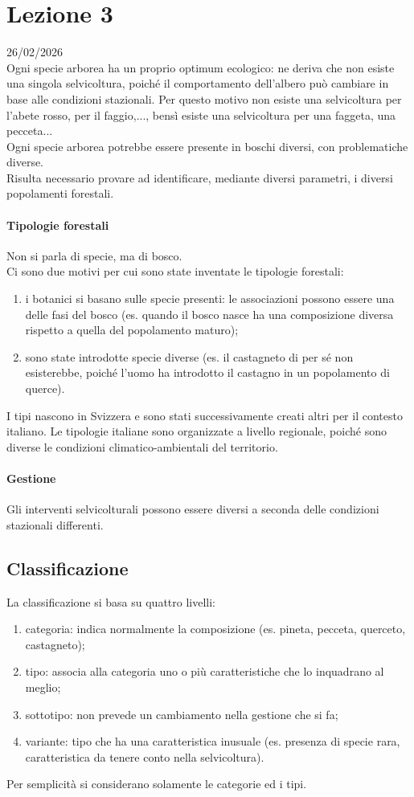 \section{Lezione 3} \hfill 26/02/2026\\
Ogni specie arborea ha un proprio optimum ecologico: ne deriva che non esiste una singola selvicoltura, poiché il comportamento dell'albero può cambiare in base alle condizioni stazionali. Per questo motivo non esiste una selvicoltura per l'abete rosso, per il faggio,..., bensì esiste una selvicoltura per una faggeta, una pecceta...\\
Ogni specie arborea potrebbe essere presente in boschi diversi, con problematiche diverse.\\
Risulta necessario provare ad identificare, mediante diversi parametri, i diversi popolamenti forestali.
\paragraph{Tipologie forestali} Non si parla di specie, ma di bosco.\\
Ci sono due motivi per cui sono state inventate le tipologie forestali:
\begin{enumerate}[nosep]
    \item i botanici si basano sulle specie presenti: le associazioni possono essere una delle fasi del bosco (es. quando il bosco nasce ha una composizione diversa rispetto a quella del popolamento maturo);
    \item sono state introdotte specie diverse (es. il castagneto di per sé non esisterebbe, poiché l'uomo ha introdotto il castagno in un popolamento di querce).
\end{enumerate}
I tipi nascono in Svizzera e sono stati successivamente creati altri per il contesto italiano. Le tipologie italiane sono organizzate a livello regionale, poiché sono diverse le condizioni climatico-ambientali del territorio.
\paragraph{Gestione} Gli interventi selvicolturali possono essere diversi a seconda delle condizioni stazionali differenti.
\subsection{Classificazione}
La classificazione si basa su quattro livelli:
\begin{enumerate}[nosep]
    \item categoria: indica normalmente la composizione (es. pineta, pecceta, querceto, castagneto);
    \item tipo: associa alla categoria uno o più caratteristiche che lo inquadrano al meglio;
    \item sottotipo: non prevede un cambiamento nella gestione che si fa;
    \item variante: tipo che ha una caratteristica inusuale (es. presenza di specie rara, caratteristica da tenere conto nella selvicoltura).
\end{enumerate}
Per semplicità si considerano solamente le categorie ed i tipi.
